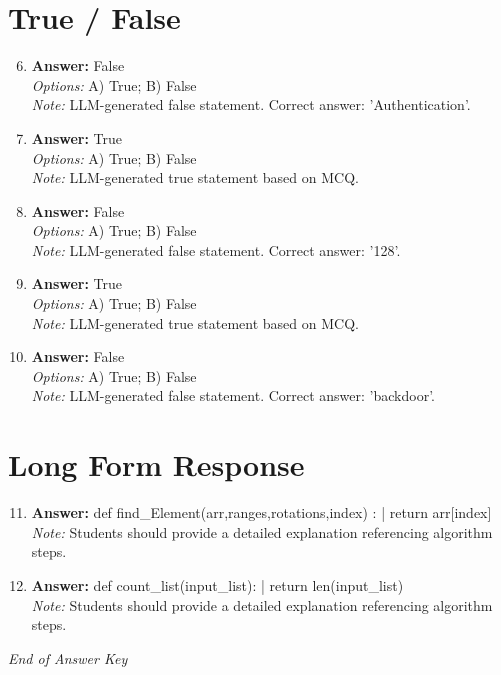 \documentclass[12pt]{article}
\begin{document}
\section*{True / False}
\begin{enumerate}[label=\arabic*.]
\setcounter{enumi}{5}
\item \textbf{Answer:} False
\\ \textit{Options:} A) True; B) False
\\ \textit{Note:} LLM-generated false statement. Correct answer: 'Authentication'.
\item \textbf{Answer:} True
\\ \textit{Options:} A) True; B) False
\\ \textit{Note:} LLM-generated true statement based on MCQ.
\item \textbf{Answer:} False
\\ \textit{Options:} A) True; B) False
\\ \textit{Note:} LLM-generated false statement. Correct answer: '128'.
\item \textbf{Answer:} True
\\ \textit{Options:} A) True; B) False
\\ \textit{Note:} LLM-generated true statement based on MCQ.
\item \textbf{Answer:} False
\\ \textit{Options:} A) True; B) False
\\ \textit{Note:} LLM-generated false statement. Correct answer: 'backdoor'.
\end{enumerate}

\section*{Long Form Response}
\begin{enumerate}[label=\arabic*.]
\setcounter{enumi}{10}
\item \textbf{Answer:} def find\_Element(arr,ranges,rotations,index) : | return arr[index]
\\ \textit{Note:} Students should provide a detailed explanation referencing algorithm steps.
\item \textbf{Answer:} def count\_list(input\_list): | return len(input\_list)
\\ \textit{Note:} Students should provide a detailed explanation referencing algorithm steps.
\end{enumerate}

\vfill
\noindent\textit{End of Answer Key}
\end{document}
